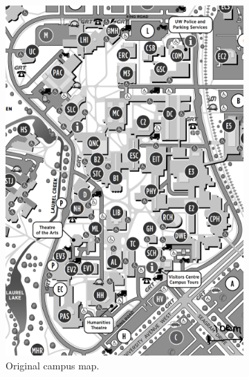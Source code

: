 \documentclass[oneside, 11pt]{book}
\begin{document}
\begin{figure}[!htbp]
    \centering
    \begin{subfigure}[t]{0.4\textwidth}
        \includegraphics[width=\linewidth]{images/campus_map.PNG}
        \caption{Original campus map.}
    \end{subfigure}
    \hfill
    \begin{subfigure}[t]{0.4\textwidth}

\end{subfigure}
\end{figure}
\end{document}
